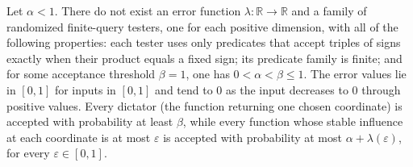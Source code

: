 \begin{theorem}
\label{FABL.no_maxE3Lin_dictatorVsNoNotables_of_perfectCompleteness}
\leanok
{}
Let $\alpha<1$. There do not exist an error function $\lambda:\mathbb R\to\mathbb R$ and
a family of randomized finite-query testers, one for each positive dimension, with all
of the following properties: each tester uses only predicates that accept triples of
signs exactly when their product equals a fixed sign; its predicate family is finite;
and for some acceptance threshold $\beta=1$, one has $0<\alpha<\beta\le1$. The error
values lie in $[0,1]$ for inputs in $[0,1]$ and tend to $0$ as the input decreases to
$0$ through positive values. Every dictator (the function returning one chosen
coordinate) is accepted with probability at least $\beta$, while every function whose
stable influence at each coordinate is at most $\varepsilon$ is accepted with
probability at most $\alpha+\lambda(\varepsilon)$, for every $\varepsilon\in[0,1]$.
\end{theorem}
